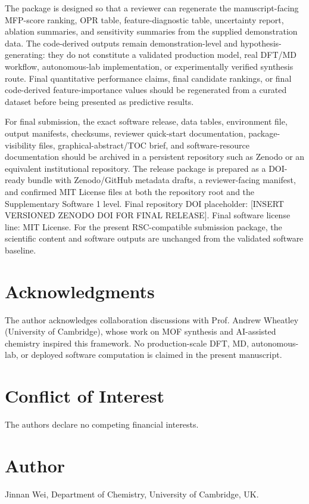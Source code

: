 \documentclass[12pt,a4paper]{article}
\begin{document}
The package is designed so that a reviewer can regenerate the manuscript-facing MFP-score ranking, OPR table, feature-diagnostic table, uncertainty report, ablation summaries, and sensitivity summaries from the supplied demonstration data. The code-derived outputs remain demonstration-level and hypothesis-generating: they do not constitute a validated production model, real DFT/MD workflow, autonomous-lab implementation, or experimentally verified synthesis route. Final quantitative performance claims, final candidate rankings, or final code-derived feature-importance values should be regenerated from a curated dataset before being presented as predictive results.

For final submission, the exact software release, data tables, environment file, output manifests, checksums, reviewer quick-start documentation, package-visibility files, graphical-abstract/TOC brief, and software-resource documentation should be archived in a persistent repository such as Zenodo or an equivalent institutional repository. The release package is prepared as a DOI-ready bundle with Zenodo/GitHub metadata drafts, a reviewer-facing manifest, and confirmed MIT License files at both the repository root and the Supplementary Software 1 level. Final repository DOI placeholder: [INSERT VERSIONED ZENODO DOI FOR FINAL RELEASE]. Final software license line: MIT License. For the present RSC-compatible submission package, the scientific content and software outputs are unchanged from the validated software baseline.

\section*{Acknowledgments}
\setlength{\parindent}{1em}  %
\setlength{\parskip}{0.5em}  %
The author acknowledges collaboration discussions with Prof. Andrew Wheatley (University of Cambridge), whose work on MOF synthesis and AI-assisted chemistry inspired this framework. No production-scale DFT, MD, autonomous-lab, or deployed software computation is claimed in the present manuscript.

\section*{Conflict of Interest}
\setlength{\parindent}{1em}
\setlength{\parskip}{0.5em}
The authors declare no competing financial interests.

\section*{Author}
\setlength{\parindent}{1em}
\setlength{\parskip}{0.5em}
Jinnan Wei, Department of Chemistry, University of Cambridge, UK.
\end{document}

